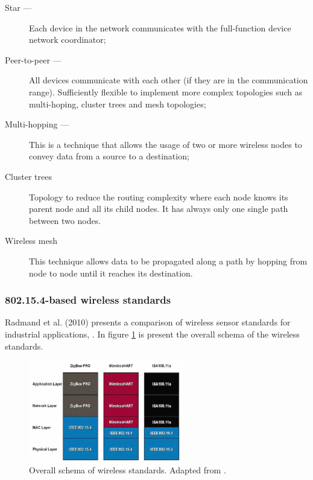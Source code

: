 \begin{description}
	\item[Star ---] Each device in the network communicates with the full-function device network coordinator;
	
	\item[Peer-to-peer ---] All devices communicate with each other (if they are in the communication range). Sufficiently flexible to implement more complex topologies such as multi-hoping, cluster trees and mesh topologies;
	
	\item[Multi-hopping ---] This is a technique that allows the usage of two or more wireless nodes to convey data from a source to a destination;
	
	\item[Cluster trees] Topology to reduce the routing complexity where each node knows its parent node and all its child nodes. It has always only one single path between two nodes.
	
	\item[Wireless mesh] This technique allows data to be propagated along a path by hopping from node to node until it reaches its destination.
	
\end{description}

\subsubsection{802.15.4-based wireless standards}

Radmand et al. (2010) presents a comparison of wireless sensor standards for industrial applications, \cite{Radmand2010}. In figure \ref{fig:radmand2010} is present the overall schema of the wireless standards.


\begin{figure}[h!]
	\centering
	\includegraphics[width=0.6\textwidth,keepaspectratio]{figures/33.WirelessN/radmand2010}
	\caption{Overall schema of wireless standards. Adapted from \cite{Radmand2010}.}
	\label{fig:radmand2010}
\end{figure}


